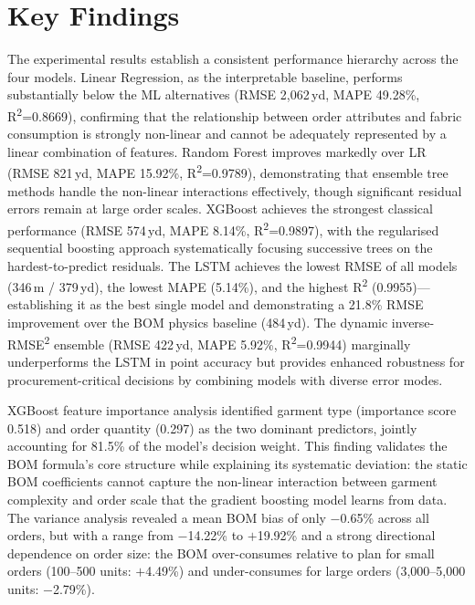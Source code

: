 \section{Key Findings}
The experimental results establish a consistent performance hierarchy across the four models. Linear Regression, as the interpretable baseline, performs substantially below the ML alternatives (RMSE 2{,}062\,yd, MAPE 49.28\%, R\textsuperscript{2}=0.8669), confirming that the relationship between order attributes and fabric consumption is strongly non-linear and cannot be adequately represented by a linear combination of features. Random Forest improves markedly over LR (RMSE 821\,yd, MAPE 15.92\%, R\textsuperscript{2}=0.9789), demonstrating that ensemble tree methods handle the non-linear interactions effectively, though significant residual errors remain at large order scales. XGBoost achieves the strongest classical performance (RMSE 574\,yd, MAPE 8.14\%, R\textsuperscript{2}=0.9897), with the regularised sequential boosting approach systematically focusing successive trees on the hardest-to-predict residuals. The LSTM achieves the lowest RMSE of all models (346\,m / 379\,yd), the lowest MAPE (5.14\%), and the highest R\textsuperscript{2} (0.9955)---establishing it as the best single model and demonstrating a 21.8\% RMSE improvement over the BOM physics baseline (484\,yd). The dynamic inverse-RMSE\textsuperscript{2} ensemble (RMSE 422\,yd, MAPE 5.92\%, R\textsuperscript{2}=0.9944) marginally underperforms the LSTM in point accuracy but provides enhanced robustness for procurement-critical decisions by combining models with diverse error modes.

XGBoost feature importance analysis identified garment type (importance score 0.518) and order quantity (0.297) as the two dominant predictors, jointly accounting for 81.5\% of the model's decision weight. This finding validates the BOM formula's core structure while explaining its systematic deviation: the static BOM coefficients cannot capture the non-linear interaction between garment complexity and order scale that the gradient boosting model learns from data. The variance analysis revealed a mean BOM bias of only $-$0.65\% across all orders, but with a range from $-$14.22\% to $+$19.92\% and a strong directional dependence on order size: the BOM over-consumes relative to plan for small orders (100--500 units: $+$4.49\%) and under-consumes for large orders (3{,}000--5{,}000 units: $-$2.79\%).

